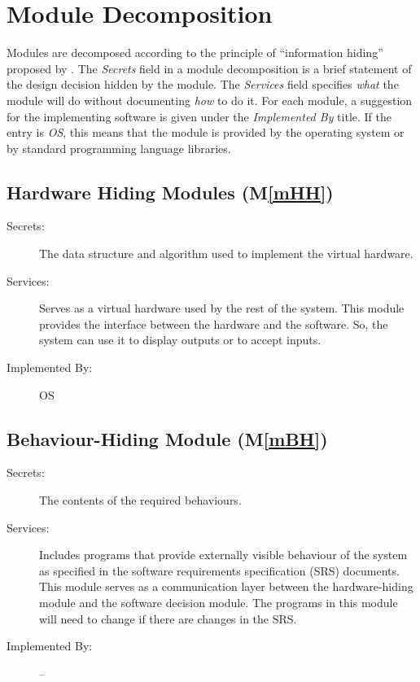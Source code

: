 \documentclass[12pt, titlepage]{article}
\newcommand{\mref}[1]{M\ref{#1}}
\begin{document}
\section{Module Decomposition} \label{SecMD}

Modules are decomposed according to the principle of ``information hiding''
proposed by \citet{ParnasEtAl1984}. The \emph{Secrets} field in a module
decomposition is a brief statement of the design decision hidden by the
module. The \emph{Services} field specifies \emph{what} the module will do
without documenting \emph{how} to do it. For each module, a suggestion for the
implementing software is given under the \emph{Implemented By} title. If the
entry is \emph{OS}, this means that the module is provided by the operating
system or by standard programming language libraries.

\subsection{Hardware Hiding Modules (\mref{mHH})}

\begin{description}
\item[Secrets:]The data structure and algorithm used to implement the virtual
  hardware.
\item[Services:]Serves as a virtual hardware used by the rest of the
  system. This module provides the interface between the hardware and the
  software. So, the system can use it to display outputs or to accept inputs.
\item[Implemented By:] OS
\end{description}

\subsection{Behaviour-Hiding Module (\mref{mBH})}

\begin{description}
\item[Secrets:]The contents of the required behaviours.
\item[Services:]Includes programs that provide externally visible behaviour of
  the system as specified in the software requirements specification (SRS)
  documents. This module serves as a communication layer between the
  hardware-hiding module and the software decision module. The programs in this
  module will need to change if there are changes in the SRS.
\item[Implemented By:] --
\end{description}
\end{document}
